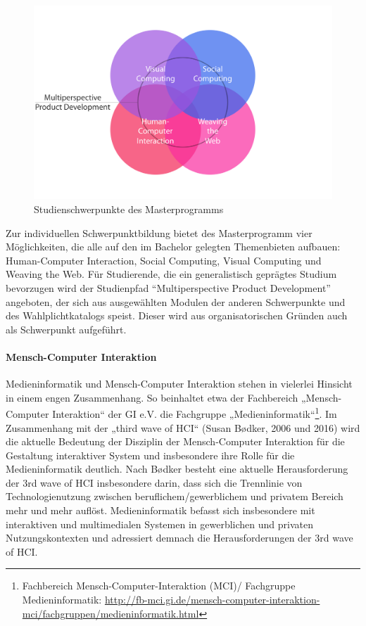 \begin{figure}[htbp]
\centering
\includegraphics[width=\columnwidth]{../anhaenge/bilder/ma-schwerpunkte.png}
\caption{Studienschwerpunkte des Masterprogramms}
\end{figure}

Zur individuellen Schwerpunktbildung bietet des Masterprogramm vier
Möglichkeiten, die alle auf den im Bachelor gelegten Themenbieten
aufbauen: Human-Computer Interaction, Social Computing, Visual Computing
und Weaving the Web. Für Studierende, die ein generalistisch geprägtes
Studium bevorzugen wird der Studienpfad ``Multiperspective Product
Development'' angeboten, der sich aus ausgewählten Modulen der anderen
Schwerpunkte und des Wahlplichtkatalogs speist. Dieser wird aus
organisatorischen Gründen auch als Schwerpunkt aufgeführt.

\paragraph{Mensch-Computer
Interaktion}\label{mensch-computer-interaktion}

Medieninformatik und Mensch-Computer Interaktion stehen in vielerlei
Hinsicht in einem engen Zusammenhang. So beinhaltet etwa der Fachbereich
„Mensch-Computer Interaktion`` der GI e.V. die Fachgruppe
„Medieninformatik``\footnote{Fachbereich Mensch-Computer-Interaktion
  (MCI)/ Fachgruppe Medieninformatik:
  \url{http://fb-mci.gi.de/mensch-computer-interaktion-mci/fachgruppen/medieninformatik.html}}.
Im Zusammenhang mit der „third wave of HCI`` (Susan Bødker, 2006 und
2016) wird die aktuelle Bedeutung der Disziplin der Mensch-Computer
Interaktion für die Gestaltung interaktiver System und insbesondere ihre
Rolle für die Medieninformatik deutlich. Nach Bødker besteht eine
aktuelle Herausforderung der 3rd wave of HCI insbesondere darin, dass
sich die Trennlinie von Technologienutzung zwischen
beruflichem/gewerblichem und privatem Bereich mehr und mehr auflöst.
Medieninformatik befasst sich insbesondere mit interaktiven und
multimedialen Systemen in gewerblichen und privaten Nutzungskontexten
und adressiert demnach die Herausforderungen der 3rd wave of HCI.

